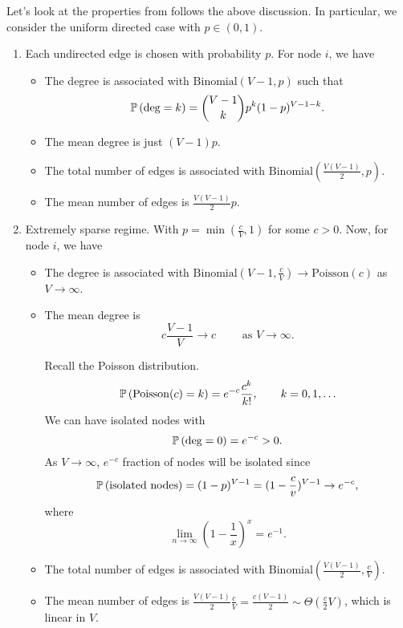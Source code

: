 Let's look at the properties from follows the above discussion. In particular, we consider the uniform directed case with \(p\in(0, 1)\).
\begin{enumerate}
	\item Each undirected edge is chosen with probability \(p\). For node \(i\), we have
	      \begin{itemize}
		      \item The degree is associated with
		            \(\mathrm{Binomial}(V-1, p)\) such that
		            \[
			            \mathbb{\MakeUppercase{P}}\left( \deg = k \right) = \binom{V-1}{k}p^k (1 - p)^{V-1-k}.
		            \]
		      \item The mean degree is just \((V-1)p\).
		      \item The total number of edges is associated with \(\mathrm{Binomial}(\frac{V(V-1)}{2}, p)\).
		      \item The mean number of edges is \(\frac{V(V-1)}{2}p\).
	      \end{itemize}
	\item Extremely sparse regime. With \(p = \min(\frac{c}{V}, 1)\) for some \(c>0\). Now, for node \(i\), we have
	      \begin{itemize}
		      \item The degree is associated with \(\mathrm{Binomial}(V - 1, \frac{c}{V}) \to \mathrm{Poisson}(c) \) as \(V\to \infty \).
		      \item The mean degree is
		            \[
			            c \frac{V-1}{V}\to c\qquad \text{ as }V\to \infty.
		            \]
		            \begin{note}
			            Recall the Poisson distribution.
			            \[
				            \mathbb{\MakeUppercase{P}}\left( \mathrm{Poisson}(c)=k  \right) = e^{-c} \frac{c^k}{k!}, \qquad k = 0, 1, \ldots
			            \]
			            We can have isolated nodes with
			            \[
				            \mathbb{\MakeUppercase{P}}\left( \deg=0 \right) = e^{-c} > 0.
			            \]
			            As \(V\to \infty \), \(e^{-c}\) fraction of nodes will be isolated since
			            \[
				            \mathbb{\MakeUppercase{P}}\left( \text{isolated nodes} \right) = (1 - p)^{V - 1} = (1 - \frac{c}{v})^{V-1} \to e^{-c},
			            \]
			            where
			            \[
				            \lim_{n \to \infty} (1 - \frac{1}{x})^x = e^{-1}.
			            \]
		            \end{note}
		      \item The total number of edges is associated with \(\mathrm{Binomial}(\frac{V(V-1)}{2}, \frac{c}{V})\).
		      \item The mean number of edges is \(\frac{V(V - 1)}{2}\frac{c}{V} = \frac{c(V - 1)}{2}\sim \Theta(\frac{c}{2}V)\), which is linear in \(V\).
	      \end{itemize}


\end{enumerate}
